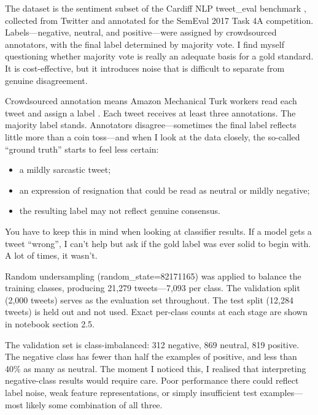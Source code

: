 \documentclass[12pt]{article}
\begin{document}
The dataset is the sentiment subset of the Cardiff NLP tweet\_eval benchmark \citep{barbieri2020tweeteval}, collected from Twitter and annotated for the SemEval 2017 Task 4A competition. Labels---negative, neutral, and positive---were assigned by crowdsourced annotators, with the final label determined by majority vote. I find myself questioning whether majority vote is really an adequate basis for a gold standard. It is cost-effective, but it introduces noise that is difficult to separate from genuine disagreement.

Crowdsourced annotation means Amazon Mechanical Turk workers read each tweet and assign a label \citep{rosenthal2017semeval}. Each tweet receives at least three annotations. The majority label stands. Annotators disagree---sometimes the final label reflects little more than a coin toss---and when I look at the data closely, the so-called ``ground truth'' starts to feel less certain:

\begin{itemize}

  \item a mildly sarcastic tweet;

  \item an expression of resignation that could be read as neutral or mildly negative;

  \item the resulting label may not reflect genuine consensus.

\end{itemize}

You have to keep this in mind when looking at classifier results. If a model gets a tweet ``wrong'', I can't help but ask if the gold label was ever solid to begin with. A lot of times, it wasn't.

Random undersampling (random\_state=82171165) was applied to balance the training classes, producing 21,279 tweets---7,093 per class. The validation split (2,000 tweets) serves as the evaluation set throughout. The test split (12,284 tweets) is held out and not used. Exact per-class counts at each stage are shown in notebook section 2.5.

The validation set is class-imbalanced: 312 negative, 869 neutral, 819 positive. The negative class has fewer than half the examples of positive, and less than 40\% as many as neutral. The moment I noticed this, I realised that interpreting negative-class results would require care. Poor performance there could reflect label noise, weak feature representations, or simply insufficient test examples---most likely some combination of all three.
\end{document}
